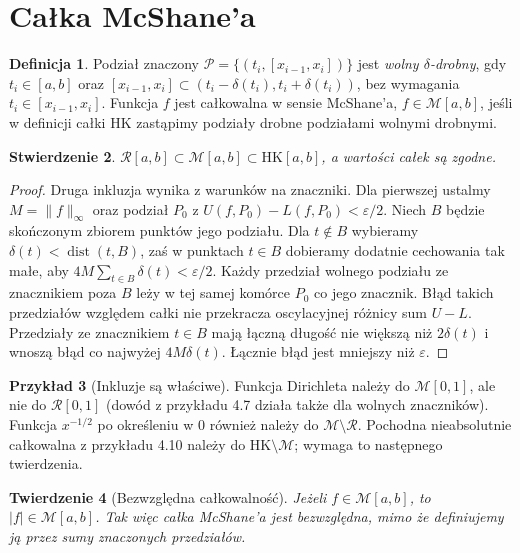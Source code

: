 \documentclass[11pt,a4paper]{article}
\numberwithin{equation}{section}
\theoremstyle{plain}
\newtheorem{twierdzenie}{Twierdzenie}[section]
\newtheorem{stwierdzenie}[twierdzenie]{Stwierdzenie}
\theoremstyle{definition}
\newtheorem{definicja}[twierdzenie]{Definicja}
\newtheorem{przyklad}[twierdzenie]{Przykład}
\theoremstyle{remark}
\newcommand{\HK}{\mathrm{HK}}
\begin{document}
\section{Całka McShane'a}
\begin{definicja}
Podział znaczony $\mathcal P=\{(t_i,[x_{i-1},x_i])\}$ jest \emph{wolny $\delta$-drobny}, gdy $t_i\in[a,b]$ oraz $[x_{i-1},x_i]\subset(t_i-\delta(t_i),t_i+\delta(t_i))$, bez wymagania $t_i\in[x_{i-1},x_i]$. Funkcja $f$ jest całkowalna w sensie McShane'a, $f\in\mathcal M[a,b]$, jeśli w definicji całki HK zastąpimy podziały drobne podziałami wolnymi drobnymi.
\end{definicja}
\begin{stwierdzenie}
$\mathcal R[a,b]\subset\mathcal M[a,b]\subset\HK[a,b]$, a wartości całek są zgodne.
\end{stwierdzenie}
\begin{proof}
Druga inkluzja wynika z warunków na znaczniki. Dla pierwszej ustalmy $M=\|f\|_\infty$ oraz podział $P_0$ z $U(f,P_0)-L(f,P_0)<\varepsilon/2$. Niech $B$ będzie skończonym zbiorem punktów jego podziału. Dla $t\notin B$ wybieramy $\delta(t)<\operatorname{dist}(t,B)$, zaś w punktach $t\in B$ dobieramy dodatnie cechowania tak małe, aby $4M\sum_{t\in B}\delta(t)<\varepsilon/2$. Każdy przedział wolnego podziału ze znacznikiem poza $B$ leży w tej samej komórce $P_0$ co jego znacznik. Błąd takich przedziałów względem całki nie przekracza oscylacyjnej różnicy sum $U-L$. Przedziały ze znacznikiem $t\in B$ mają łączną długość nie większą niż $2\delta(t)$ i wnoszą błąd co najwyżej $4M\delta(t)$. Łącznie błąd jest mniejszy niż $\varepsilon$.
\end{proof}
\begin{przyklad}[Inkluzje są właściwe]
Funkcja Dirichleta należy do $\mathcal M[0,1]$, ale nie do $\mathcal R[0,1]$ (dowód z przykładu 4.7 działa także dla wolnych znaczników). Funkcja $x^{-1/2}$ po określeniu w $0$ również należy do $\mathcal M\setminus\mathcal R$. Pochodna nieabsolutnie całkowalna z przykładu 4.10 należy do $\HK\setminus\mathcal M$; wymaga to następnego twierdzenia.
\end{przyklad}
\begin{twierdzenie}[Bezwzględna całkowalność]
Jeżeli $f\in\mathcal M[a,b]$, to $|f|\in\mathcal M[a,b]$. Tak więc całka McShane'a jest bezwzględna, mimo że definiujemy ją przez sumy znaczonych przedziałów.
\end{twierdzenie}
\end{document}

